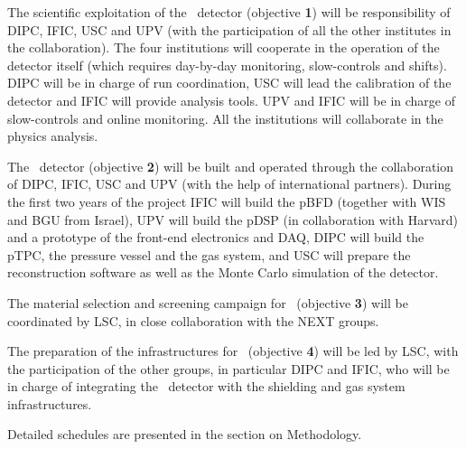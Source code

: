 
The scientific exploitation of the \Next\ detector (objective {\bf 1}) will be responsibility of DIPC, IFIC,  USC and UPV (with the participation of all the other institutes in the collaboration). The four institutions will cooperate in the operation of the detector itself (which requires day-by-day monitoring, slow-controls and shifts). DIPC will be in charge of run coordination, USC will lead the calibration of the detector and IFIC will provide analysis tools. UPV and IFIC will be in charge of slow-controls and online monitoring. All the institutions will collaborate in the physics analysis.  


The \HDEMO\ detector (objective {\bf 2}) will be built and operated through the collaboration of DIPC, IFIC, USC and UPV (with the help of international partners). 
During the first two years of the project IFIC will build the pBFD (together with WIS and BGU from Israel), UPV will build the pDSP (in collaboration with Harvard) and a prototype of the front-end electronics and DAQ, DIPC will build the pTPC, the pressure vessel and the gas system, and USC will prepare the reconstruction software as well as the Monte Carlo simulation of the detector. 

The material selection and screening campaign for \NHD\ (objective {\bf 3})  will be coordinated by LSC, in close collaboration with the NEXT groups. 

The preparation of the infrastructures for \NHD\ (objective {\bf 4})  will be led by LSC, with the participation of the other groups, in particular DIPC and IFIC, who will be in charge of integrating the \NHD\ detector with the shielding and gas system infrastructures.

Detailed schedules are presented in the section on Methodology.  
  